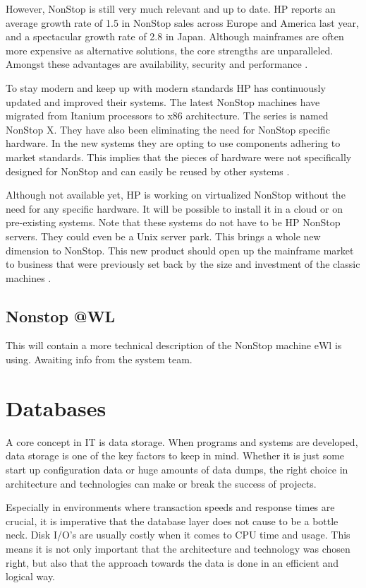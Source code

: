 However, NonStop is still very much relevant and up to date. HP reports an average growth rate of 1.5 in NonStop sales across Europe and America last year,
and a spectacular growth rate of 2.8 in Japan. Although mainframes are often more expensive as alternative solutions, the core strengths are unparalleled.
Amongst these advantages are availability, security and performance \autocite{imageproblem}. 

To stay modern and keep up with modern standards HP has continuously updated and improved their systems. The
latest NonStop machines have migrated from Itanium processors to x86 architecture. The series is named NonStop X. They have also been
eliminating the need for NonStop specific hardware. In the new systems they are opting to use components adhering to market standards. This
implies that the pieces of hardware were not specifically designed for NonStop and can easily be reused by other systems \autocite{presentation}.

Although not available yet, HP is working on virtualized NonStop without the need for any specific hardware.
It will be possible to install it in a cloud or on pre-existing systems. Note that these systems do not have to be HP NonStop servers. They could
even be a Unix server park. This brings a whole new dimension to NonStop. This new product should open up the mainframe market to business that were previously
set back by the size and investment of the classic machines \autocite{presentation}.

\subsection{Nonstop @WL}

This will contain a more technical description of the NonStop machine eWl is using. Awaiting info from the system team. 
\newpage
\section{Databases}
A core concept in IT is data storage. When programs and systems are developed, data storage is one of the key factors to keep in mind. Whether it is just some start up configuration data or huge amounts of data dumps, the right choice in architecture and technologies can make or break the success of projects. 

Especially in environments where transaction speeds and response times are crucial, it is imperative that the database layer does not cause to be a bottle neck. Disk I/O's are usually costly when it comes to CPU time and usage. This means it is not only important that the architecture and technology was chosen right, but also that the approach towards the data is done in an efficient and logical way.

